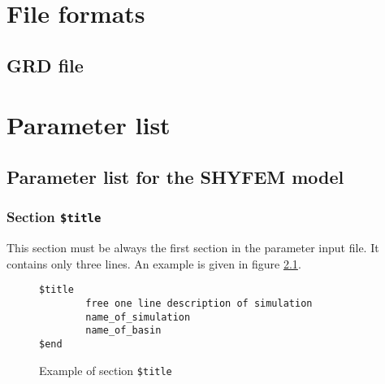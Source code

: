 \documentclass{report}
\begin{document}
	

\chapter{File formats}
\label{file_formats}


	\section{GRD file}
	







\chapter{Parameter list}


\section{Parameter list for the SHYFEM model}


\subsection{Section {\tt \$title}}

This section must be always the first section in the parameter input file.
It contains only three lines. An example is given in 
figure \ref{fig:titleexample}.

\begin{figure}[ht]
\begin{verbatim}
$title
        free one line description of simulation
        name_of_simulation
        name_of_basin
$end
\end{verbatim}
\caption{Example of section {\tt \$title}}
\label{fig:titleexample}
\end{figure}
\end{document}
